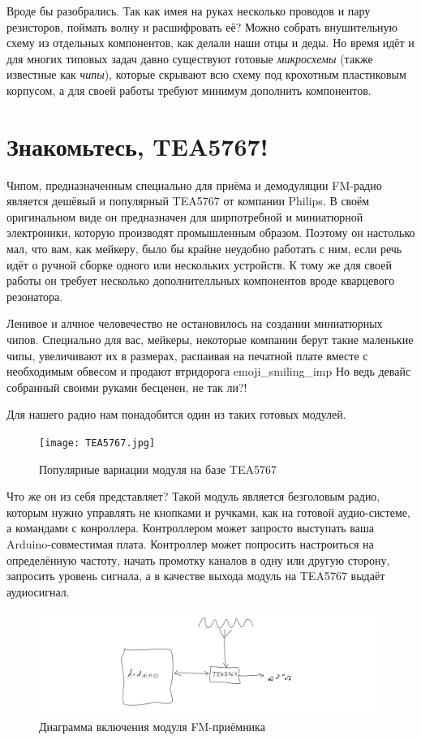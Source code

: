 Вроде бы разобрались. Так как имея на руках несколько проводов и пару резисторов, поймать волну и расшифровать её? Можно собрать внушительную схему из отдельных компонентов, как делали наши отцы и деды. Но время идёт и для многих типовых задач давно существуют готовые \emph{микросхемы} (также известные как \emph{чипы}), которые скрывают всю схему под крохотным пластиковым корпусом, а для своей работы требуют минимум дополнить компонентов.

\section{Знакомьтесь, TEA5767!}

Чипом, предназначенным специально для приёма и демодуляции FM-радио является дешёвый и популярный TEA5767 от компании Philips. В своём оригинальном виде он предназначен для ширпотребной и миниатюрной электроники, которую производят промышленным образом. Поэтому он настолько мал, что вам, как мейкеру, было бы крайне неудобно работать с ним, если речь идёт о ручной сборке одного или нескольких устройств. К тому же для своей работы он требует несколько дополнителльных компонентов вроде кварцевого резонатора.

Ленивое и алчное человечество не остановилось на создании миниатюрных чипов. Специально для вас, мейкеры, некоторые компании берут такие маленькие чипы, увеличивают их в размерах, распаивая на печатной плате вместе с необходимым обвесом и продают втридорога \textbar emoji\_smiling\_imp\textbar{} Но ведь девайс собранный своими руками бесценен, не так ли?!

Для нашего радио нам понадобится один из таких готовых модулей.

\begin{figure}
  \centering
  \texttt{[image: TEA5767.jpg]}
  \caption{Популярные вариации модуля на базе TEA5767}
\end{figure}

Что же он из себя представляет? Такой модуль является безголовым радио, которым нужно управлять не кнопками и ручками, как на готовой аудио-системе, а командами с конроллера. Контроллером может запросто выступать ваша Arduino-совместимая плата. Контроллер может попросить настроиться на определённую частоту, начать промотку каналов в одну или другую сторону, запросить уровень сигнала, а в качестве выхода модуль на TEA5767 выдаёт аудиосигнал.

\begin{figure}
  \centering
  \includegraphics{sketches/fm-receiver-diagram}
  \caption{Диаграмма включения модуля FM-приёмника}
\end{figure}

